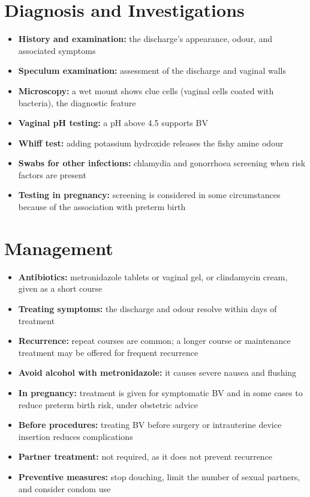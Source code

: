 \section*{Diagnosis and Investigations}
\begin{itemize}
    \item \textbf{History and examination:} the discharge's appearance, odour, and associated symptoms
    \item \textbf{Speculum examination:} assessment of the discharge and vaginal walls
    \item \textbf{Microscopy:} a wet mount shows clue cells (vaginal cells coated with bacteria), the diagnostic feature
    \item \textbf{Vaginal pH testing:} a pH above 4.5 supports BV
    \item \textbf{Whiff test:} adding potassium hydroxide releases the fishy amine odour
    \item \textbf{Swabs for other infections:} chlamydia and gonorrhoea screening when risk factors are present
    \item \textbf{Testing in pregnancy:} screening is considered in some circumstances because of the association with preterm birth
\end{itemize}

\section*{Management}
\begin{itemize}
    \item \textbf{Antibiotics:} metronidazole tablets or vaginal gel, or clindamycin cream, given as a short course
    \item \textbf{Treating symptoms:} the discharge and odour resolve within days of treatment
    \item \textbf{Recurrence:} repeat courses are common; a longer course or maintenance treatment may be offered for frequent recurrence
    \item \textbf{Avoid alcohol with metronidazole:} it causes severe nausea and flushing
    \item \textbf{In pregnancy:} treatment is given for symptomatic BV and in some cases to reduce preterm birth risk, under obstetric advice
    \item \textbf{Before procedures:} treating BV before surgery or intrauterine device insertion reduces complications
    \item \textbf{Partner treatment:} not required, as it does not prevent recurrence
    \item \textbf{Preventive measures:} stop douching, limit the number of sexual partners, and consider condom use
\end{itemize}

